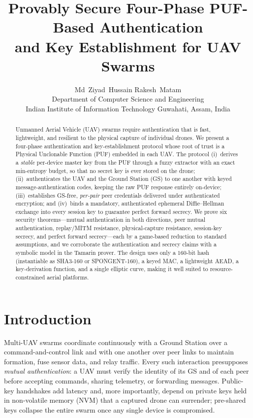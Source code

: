 \documentclass[11pt,a4paper]{article}
\title{\vspace{-1.2em}\bfseries\color{navy}
Provably Secure Four-Phase PUF-Based Authentication\\[2pt]
and Key Establishment for UAV Swarms}
\author{Md~Ziyad~Hussain \qquad Rakesh~Matam\\[2pt]
\normalsize Department of Computer Science and Engineering\\[1pt]
\normalsize Indian Institute of Information Technology Guwahati, Assam, India}
\date{}
\theoremstyle{jrnlplain}
\theoremstyle{jrnldef}
\begin{document}
\maketitle

\begin{abstract}
\noindent
Unmanned Aerial Vehicle (UAV) swarms require authentication that is fast,
lightweight, and resilient to the physical capture of individual drones.
We present a four-phase authentication and key-establishment protocol whose
root of trust is a Physical Unclonable Function (PUF) embedded in each UAV.
The protocol (i)~derives a \emph{stable} per-device master key from the PUF
through a fuzzy extractor with an exact min-entropy budget, so that no secret
key is ever stored on the drone; (ii)~authenticates the UAV and the Ground
Station (GS) to one another with keyed message-authentication codes, keeping
the raw PUF response entirely on-device; (iii)~establishes GS-free,
\emph{per-pair} peer credentials delivered under authenticated encryption;
and (iv)~binds a mandatory, authenticated ephemeral Diffie--Hellman exchange
into every session key to guarantee perfect forward secrecy. We prove six
security theorems---mutual authentication in both directions, peer mutual
authentication, replay/MITM resistance, physical-capture resistance,
session-key secrecy, and perfect forward secrecy---each by a game-based
reduction to standard assumptions, and we corroborate the authentication and
secrecy claims with a symbolic model in the Tamarin prover. The design uses
only a $160$-bit hash (instantiable as SHA3-160 or SPONGENT-160), a keyed
MAC, a lightweight AEAD, a key-derivation function, and a single elliptic
curve, making it well suited to resource-constrained aerial platforms.
\end{abstract}

\medskip

\section{Introduction}
Multi-UAV swarms coordinate continuously with a Ground Station over a
command-and-control link and with one another over peer links to maintain
formation, fuse sensor data, and relay traffic. Every such interaction
presupposes \emph{mutual authentication}: a UAV must verify the identity of
its GS and of each peer before accepting commands, sharing telemetry, or
forwarding messages. Public-key handshakes add latency and, more importantly,
depend on private keys held in non-volatile memory (NVM) that a captured drone
can surrender; pre-shared keys collapse the entire swarm once any single
device is compromised.
\end{document}
